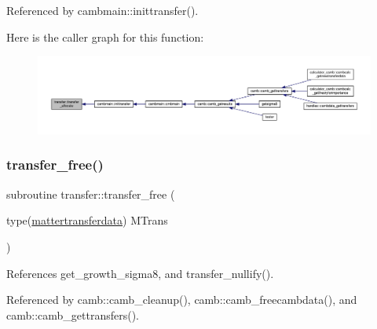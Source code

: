 Referenced by cambmain\+::inittransfer().

Here is the caller graph for this function\+:
\nopagebreak
\begin{figure}[H]
\begin{center}
\leavevmode
\includegraphics[width=350pt]{namespacetransfer_a687f977819e9abe471f86cff900939e7_icgraph}
\end{center}
\end{figure}
\mbox{\label{namespacetransfer_a34407967277591afeb26880a4f0926dc}} 
\subsubsection{\texorpdfstring{transfer\+\_\+free()}{transfer\_free()}}
{\footnotesize\ttfamily subroutine transfer\+::transfer\+\_\+free (\begin{DoxyParamCaption}\item[{type(\mbox{\hyperlink{structtransfer_1_1mattertransferdata}{mattertransferdata}})}]{M\+Trans }\end{DoxyParamCaption})}



References get\+\_\+growth\+\_\+sigma8, and transfer\+\_\+nullify().



Referenced by camb\+::camb\+\_\+cleanup(), camb\+::camb\+\_\+freecambdata(), and camb\+::camb\+\_\+gettransfers().

